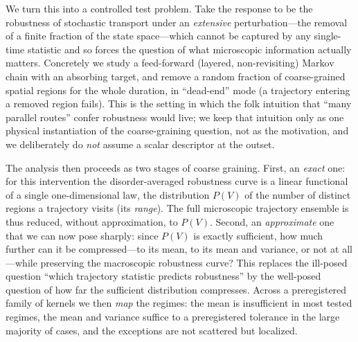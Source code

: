\documentclass[aps,pre,twocolumn,superscriptaddress,floatfix,longbibliography]{revtex4-2}
\begin{document}
We turn this into a controlled test problem. Take the response to be the robustness
of stochastic transport under an \emph{extensive} perturbation---the removal of a
finite fraction of the state space---which cannot be captured by any single-time
statistic and so forces the question of what microscopic information actually
matters. Concretely we study a feed-forward (layered, non-revisiting) Markov chain
with an absorbing target, and remove a random fraction of coarse-grained spatial
regions for the whole duration, in ``dead-end'' mode (a trajectory entering a
removed region fails). This is the setting in which the folk intuition that ``many
parallel routes'' confer robustness would live; we keep that intuition only as one
physical instantiation of the coarse-graining question, not as the motivation, and
we deliberately do \emph{not} assume a scalar descriptor at the outset.

The analysis then proceeds as two stages of coarse graining. First, an \emph{exact}
one: for this intervention the disorder-averaged robustness curve is a linear
functional of a single one-dimensional law, the distribution $P(V)$ of the number
of distinct regions a trajectory visits (its \emph{range}). The full microscopic
trajectory ensemble is thus reduced, without approximation, to $P(V)$. Second, an
\emph{approximate} one that we can now pose sharply: since $P(V)$ is exactly
sufficient, how much further can it be compressed---to its mean, to its mean and
variance, or not at all---while preserving the macroscopic robustness curve? This
replaces the ill-posed question ``which trajectory statistic predicts robustness''
by the well-posed question of how far the sufficient distribution compresses. Across
a preregistered family of kernels we then \emph{map} the regimes: the mean is
insufficient in most tested regimes, the mean and variance suffice to a preregistered
tolerance in the large majority of cases, and the exceptions are not scattered but
localized.
\end{document}
